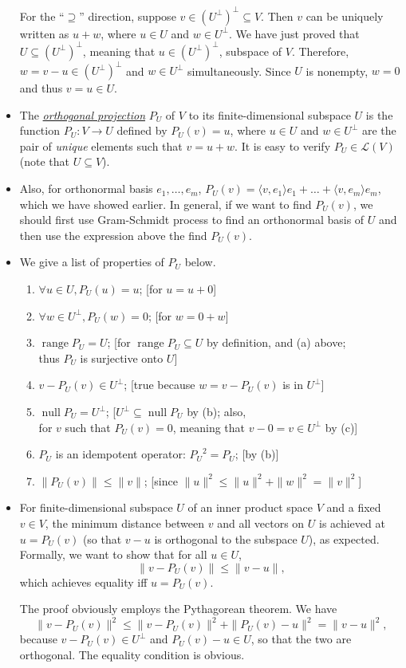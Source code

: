 \documentclass{article}
\newcommand{\df}[1]{\ul{\textit{#1}}}
\newcommand{\n}{\operatorname{null}}
\renewcommand{\r}{\operatorname{range}}
\newcommand{\inp}[2]{\langle #1, #2 \rangle}
\newcommand{\nm}[1]{\| #1 \|}
\newcommand{\LV}{\mathcal{L}(V)}
\begin{document}
\begin{itemize}
    For the ``$\supseteq$'' direction, suppose $v \in (U^\perp)^\perp \subseteq V$. Then $v$ can be uniquely written as $u+w$, where $u \in U$ and $w \in U^\perp$. We have just proved that $U \subseteq (U^\perp)^\perp$, meaning that $u \in (U^\perp)^\perp$, subspace of $V$. Therefore, $w = v-u \in (U^\perp)^\perp$ and $w \in U^\perp$ simultaneously. Since $U$ is nonempty, $w = 0$ and thus $v = u \in U$.
    \item The \df{orthogonal projection} $P_U$ of $V$ to its finite-dimensional subspace $U$ is the function $P_U: V \to U$ defined by $P_U(v) = u$, where $u \in U$ and $w \in U^\perp$ are the pair of \emph{unique} elements such that $v = u+w$. It is easy to verify $P_U \in \LV$ (note that $U \subseteq V$).
    \item Also, for orthonormal basis $e_1,\dots,e_m$, $P_U(v) = \inp{v}{e_1}e_1+\dots+\inp{v}{e_m}e_m$, which we have showed earlier. In general, if we want to find $P_U(v)$, we should first use Gram-Schmidt process to find an orthonormal basis of $U$ and then use the expression above the find $P_U(v)$.
    \item We give a list of properties of $P_U$ below.
    \begin{enumerate}[label=(\alph*)]
        \item $\forall u \in U, P_U(u) = u$; [for $u = u+0$]
        \item $\forall w \in U^\perp, P_U(w) = 0$; [for $w = 0+w$]
        \item $\r P_U = U$; [for $\r P_U \subseteq U$ by definition, and (a) above; \\ thus $P_U$ is surjective onto $U$]
        \item $v - P_U(v) \in U^\perp$; [true because $w = v - P_U(v)$ is in $U^\perp$]
        \item $\n P_U = U^\perp$; [$U^\perp \subseteq \n P_U$ by (b); also, \\ for $v$ such that $P_U(v) = 0$, meaning that $v - 0 = v \in U^\perp$ by (c)]
        \item $P_U$ is an idempotent operator: ${P_U}^2 = P_U$; [by (b)]
        \item $\nm{P_U(v)} \leq \nm{v}$; [since $\nm{u}^2 \leq \nm{u}^2 + \nm{w}^2 = \nm{v}^2$]
    \end{enumerate}
    \item For finite-dimensional subspace $U$ of an inner product space $V$ and a fixed $v \in V$, the minimum distance between $v$ and all vectors on $U$ is achieved at $u = P_U(v)$ (so that $v - u$ is orthogonal to the subspace $U$), as expected. Formally, we want to show that for all $u \in U$, $$\nm{v - P_U(v)} \leq \nm{v-u},$$ which achieves equality iff $u = P_U(v)$.
    
    The proof obviously employs the Pythagorean theorem. We have
    \begin{equation*}
        \nm{v - P_U(v)}^2 \leq \nm{v - P_U(v)}^2+\nm{P_U(v) - u}^2 = \nm{v - u}^2,
    \end{equation*}
    because $v - P_U(v) \in U^\perp$ and $P_U(v) - u \in U$, so that the two are orthogonal. The equality condition is obvious.
\end{itemize}
\end{document}
